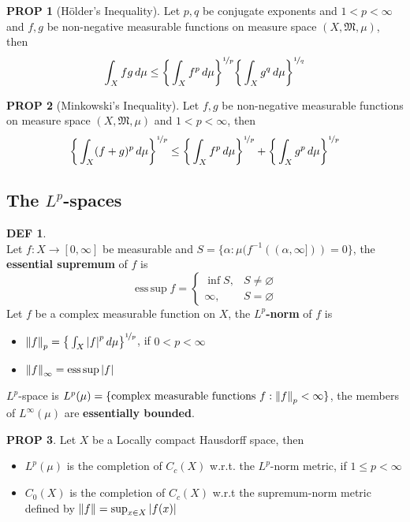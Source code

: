 \documentclass[hidelinks,10pt]{article}
\theoremstyle{definition}
\newtheorem*{defin}{DEF}
\theoremstyle{dotles}
\theoremstyle{dotless}
\newtheorem{proposition}{PROP}[section]
\theoremstyle{remark}
\DeclareMathOperator{\esssup}{ess\,sup}
\begin{document}
\begin{proposition}[Hölder's Inequality]
Let $p,q$ be conjugate exponents and $1<p<\infty$ and $f,g$ be non-negative measurable functions on measure space $(X,\mathfrak{M},\mu)$, then
\[\int_Xfg\,d\mu\leq\bigg\{\int_Xf^p\,d\mu\bigg\}^{\nicefrac{1}{p}}\bigg\{\int_Xg^q\,d\mu\bigg\}^{\nicefrac{1}{q}}\]
\end{proposition}

\begin{proposition}[Minkowski's Inequality]
Let $f,g$ be non-negative measurable functions on measure space $(X,\mathfrak{M},\mu)$ and $1<p<\infty$, then
\[\bigg\{\int_X(f+g)^p\,d\mu\bigg\}^{\nicefrac{1}{p}}\leq\bigg\{\int_Xf^p\,d\mu\bigg\}^{\nicefrac{1}{p}}+\bigg\{\int_Xg^p\,d\mu\bigg\}^{\nicefrac{1}{p}}\]
\end{proposition}

\subsection{The $L^p$-spaces}

\begin{defin}~\\
Let $f:X\to[0,\infty]$ be measurable and $S=\{\alpha:\mu(f^{-1}((\alpha,\infty]))=0\}$, the \textbf{essential supremum} of $f$ is
\[\esssup f=\begin{cases}
\inf S,&S\neq\varnothing\\
\infty,&S=\varnothing
\end{cases}\]\bigbreak
Let $f$ be a complex measurable function on $X$, the \textbf{$L^p$-norm} of $f$ is\begin{itemize}
    \item $\norm{f}_p=\big\{\int_X\abs{f}^p\,d\mu\big\}^{\nicefrac{1}{p}}$, if $0<p<\infty$
    \item $\norm{f}_\infty=\esssup\abs{f}$
\end{itemize}
$L^p$-space is $L^p(\mu)=\{\textrm{complex measurable functions }f:\norm{f}_p<\infty\}$, the members of $L^\infty(\mu)$ are \textbf{essentially bounded}.
\end{defin}

\begin{proposition}
Let $X$ be a Locally compact Hausdorff space, then\begin{itemize}
    \item $L^p(\mu)$ is the completion of $C_c(X)$ w.r.t. the $L^p$-norm metric, if $1\leq p<\infty$
    \item $C_0(X)$ is the completion of $C_c(X)$ w.r.t the supremum-norm metric defined by $\norm{f}=\sup_{x\in X}\abs{f(x)}$
\end{itemize}
\end{proposition}
\end{document}
